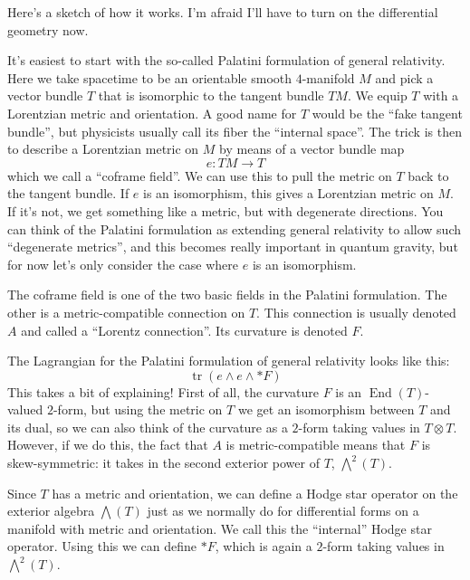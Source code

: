 \documentclass{article}
\begin{document}
Here's a sketch of how it works. I'm afraid I'll have to turn on the
differential geometry now.

It's easiest to start with the so-called Palatini formulation of general
relativity. Here we take spacetime to be an orientable smooth
\(4\)-manifold \(M\) and pick a vector bundle \(T\) that is isomorphic
to the tangent bundle \(TM\). We equip \(T\) with a Lorentzian metric
and orientation. A good name for \(T\) would be the ``fake tangent
bundle'', but physicists usually call its fiber the ``internal space''.
The trick is then to describe a Lorentzian metric on \(M\) by means of a
vector bundle map \[e\colon TM \to T\] which we call a ``coframe
field''. We can use this to pull the metric on \(T\) back to the tangent
bundle. If \(e\) is an isomorphism, this gives a Lorentzian metric on
\(M\). If it's not, we get something like a metric, but with degenerate
directions. You can think of the Palatini formulation as extending
general relativity to allow such ``degenerate metrics'', and this
becomes really important in quantum gravity, but for now let's only
consider the case where \(e\) is an isomorphism.

The coframe field is one of the two basic fields in the Palatini
formulation. The other is a metric-compatible connection on \(T\). This
connection is usually denoted \(A\) and called a ``Lorentz connection''.
Its curvature is denoted \(F\).

The Lagrangian for the Palatini formulation of general relativity looks
like this: \[\operatorname{tr}(e\wedge e\wedge *F)\] This takes a bit of
explaining! First of all, the curvature \(F\) is an
\(\operatorname{End}(T)\)-valued \(2\)-form, but using the metric on
\(T\) we get an isomorphism between \(T\) and its dual, so we can also
think of the curvature as a \(2\)-form taking values in \(T \otimes T\).
However, if we do this, the fact that \(A\) is metric-compatible means
that \(F\) is skew-symmetric: it takes in the second exterior power of
\(T\), \(\bigwedge^2(T)\).

Since \(T\) has a metric and orientation, we can define a Hodge star
operator on the exterior algebra \(\bigwedge(T)\) just as we normally do
for differential forms on a manifold with metric and orientation. We
call this the ``internal'' Hodge star operator. Using this we can define
\(*F\), which is again a \(2\)-form taking values in \(\bigwedge^2(T)\).
\end{document}
